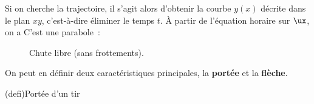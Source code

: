\documentclass[../../main/main.tex]{subfiles}
\begin{document}
Si on cherche la trajectoire, il s'agit alors d'obtenir la courbe $y(x)$ décrite
dans le plan $xy$, c'est-à-dire éliminer le temps $t$. À partir de l'équation
horaire sur $\ux$, on a
C'est une parabole~:

\begin{figure}[htbp!]
	\centering
	\caption{Chute libre (sans frottements).}
	\label{fig:cl_ssf-traj}
\end{figure}

On peut en définir deux caractéristiques principales, la \textbf{portée} et la
\textbf{flèche}.

\begin{tcb*}(defi){Portée d'un tir}
\end{tcb*}
\end{document}
